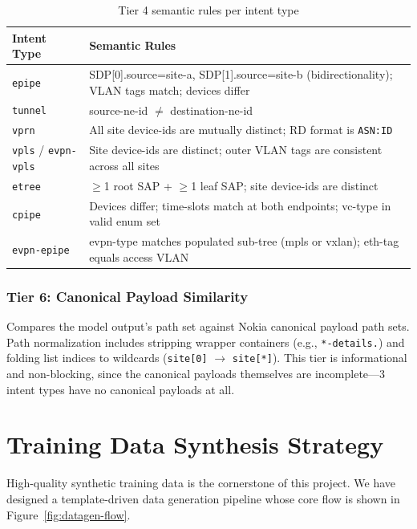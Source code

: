 \documentclass[12pt, a4paper]{article}
\newcommand{\intenttype}[1]{\texttt{#1}}
\begin{document}
\begin{table}[H]
\centering
\caption{Tier 4 semantic rules per intent type}
\label{tab:semantic-rules}
\small
\begin{tabular}{lp{10.5cm}}
\toprule
\textbf{Intent Type} & \textbf{Semantic Rules} \\
\midrule
\intenttype{epipe} &
  SDP[0].source=site-a, SDP[1].source=site-b (bidirectionality); VLAN tags match; devices differ \\
\intenttype{tunnel} &
  source-ne-id $\neq$ destination-ne-id \\
\intenttype{vprn} &
  All site device-ids are mutually distinct; RD format is \texttt{ASN:ID} \\
\intenttype{vpls} / \intenttype{evpn-vpls} &
  Site device-ids are distinct; outer VLAN tags are consistent across all sites \\
\intenttype{etree} &
  $\geq$1 root SAP + $\geq$1 leaf SAP; site device-ids are distinct \\
\intenttype{cpipe} &
  Devices differ; time-slots match at both endpoints; vc-type in valid enum set \\
\intenttype{evpn-epipe} &
  evpn-type matches populated sub-tree (mpls or vxlan); eth-tag equals access VLAN \\
\bottomrule
\end{tabular}
\end{table}

\subsubsection{Tier 6: Canonical Payload Similarity}
\label{sec:tier6}

Compares the model output's path set against Nokia canonical payload path sets. Path normalization includes stripping wrapper containers (e.g., \texttt{*-details.}) and folding list indices to wildcards (\texttt{site[0]} $\to$ \texttt{site[*]}). This tier is informational and non-blocking, since the canonical payloads themselves are incomplete---3 intent types have no canonical payloads at all.

\section{Training Data Synthesis Strategy}
\label{sec:data-generation}

High-quality synthetic training data is the cornerstone of this project. We have designed a template-driven data generation pipeline whose core flow is shown in Figure~\ref{fig:datagen-flow}.
\end{document}
